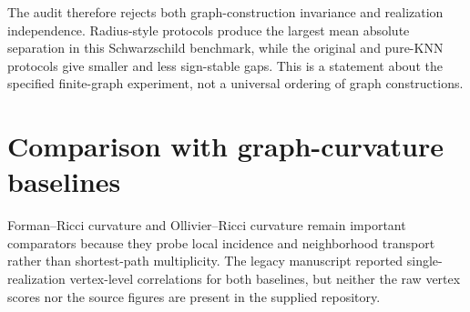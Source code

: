 \documentclass[11pt,a4paper]{article}
\begin{document}
\begin{table}[H]
\centering
\caption{Paired contrasts in $|\Delta\rho_r|$. The contrast is protocol A minus protocol B; intervals are two-sided Student-$t$ intervals over ten paired seeds.}
\label{tab:paired-contrasts}
\small
{}
\end{table}

The audit therefore rejects both graph-construction invariance and realization independence. Radius-style protocols produce the largest mean absolute separation in this Schwarzschild benchmark, while the original and pure-KNN protocols give smaller and less sign-stable gaps. This is a statement about the specified finite-graph experiment, not a universal ordering of graph constructions.

\section{Comparison with graph-curvature baselines}
\label{sec:baselines}

Forman--Ricci curvature \cite{Forman2003} and Ollivier--Ricci curvature \cite{Ollivier2009} remain important comparators because they probe local incidence and neighborhood transport rather than shortest-path multiplicity. The legacy manuscript reported single-realization vertex-level correlations for both baselines, but neither the raw vertex scores nor the source figures are present in the supplied repository.
\end{document}
